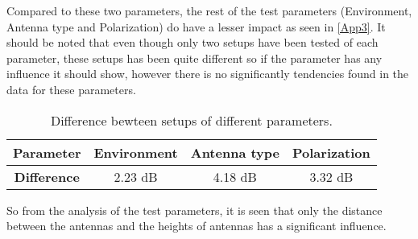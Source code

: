 Compared to these two parameters, the rest of the test parameters (Environment, Antenna type and Polarization) do have a lesser impact as seen in \autoref{App3}. It should be noted that even though only two setups have been tested of each parameter, these setups has been quite different so if the parameter has any influence it should show, however there is no significantly tendencies found in the data for these parameters. 


\begin{table}[!htbp]
\centering
\begin{tabular}{|c|c|c|c|}
\hline
   \textbf{Parameter}& Environment & Antenna type & Polarization\\\hline
\textbf{Difference} & 2.23 dB & 4.18 dB & 3.32 dB \\\hline
\end{tabular}
\caption{Difference bewteen setups of different parameters.}
\label{App3}
\end{table}



So from the analysis of the test parameters, it is seen that only the distance between the antennas and the heights of antennas has a significant influence. 

